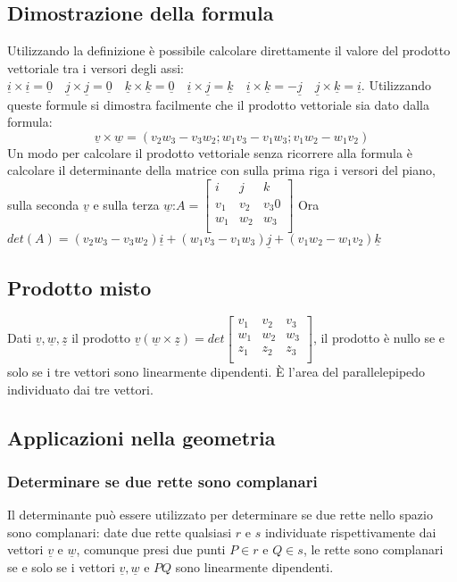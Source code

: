 \subsection{Dimostrazione della formula}
Utilizzando la definizione \`e possibile calcolare direttamente il valore del prodotto vettoriale tra i versori degli assi:$\underline{i} \times \underline{i} = \underline{0}
\quad\underline{j} \times \underline{j} = \underline{0}\quad\underline{k} \times \underline{k} = \underline{0}\quad\underline{i} \times \underline{j} = \underline{k}\quad
\underline{i} \times \underline{k} = -\underline{j}\quad\underline{j} \times \underline{k} = \underline{i}$. Utilizzando queste formule si dimostra facilmente che il prodotto 
vettoriale sia dato dalla formula:
\begin{equation}
\underline{v}\times\underline{w}=(v_2w_3-v_3w_2;w_1v_3-v_1w_3;v_1w_2-w_1v_2)
\end{equation}
Un modo per calcolare il prodotto vettoriale senza ricorrere alla formula \`e calcolare il determinante della matrice con sulla prima riga i versori del piano, sulla seconda $\underline{v}$ e sulla terza $\underline{w}$:$A=
\left[\begin{matrix}
i & j & k \\
v_1 & v_2 & v_3 0\\
w_1 & w_2 & w_3 \\
\end{matrix}\right]$
Ora $det(A)=(v_2w_3-v_3w_2)\underline{i}+(w_1v_3-v_1w_3)\underline{j}+(v_1w_2-w_1v_2)\underline{k}$
\subsection{Prodotto misto}
Dati $\underline{v},\underline{w},\underline{z}$ il prodotto $\underline{v}(\underline{w}\times\underline{z})=det
\left[\begin{matrix}
v_1 & v_2 & v_3 \\
w_1 & w_2 & w_3 \\
z_1 & z_2 & z_3 \\
\end{matrix}\right]
$, il prodotto \`e nullo se e solo se i tre vettori sono linearmente dipendenti. \`E l'area del parallelepipedo individuato dai tre vettori.
\subsection{Applicazioni nella geometria}
\subsubsection{Determinare se due rette sono complanari}
Il determinante pu\`o essere utilizzato per determinare se due rette nello spazio sono complanari: date due rette qualsiasi $r$ e $s$ individuate rispettivamente dai 
vettori $\underline{v}$ e $\underline{w}$, comunque presi due punti $P\in r$ e $Q\in s$, le rette sono complanari se e solo se i vettori $\underline{v},\underline{w}$ e $PQ$ 
sono linearmente dipendenti.
